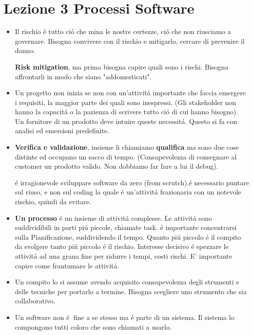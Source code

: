 \documentclass[a4paper,10pt] {article}
\begin{document}
\section{Lezione 3 Processi Software}
\begin{itemize}
	\item Il rischio \'e tutto ci\'o che mina le nostre certezze, ci\'o che non 
	riusciamo a governare. Bisogna convivere con
	il rischio e mitigarlo, cercare di prevenire il danno.
	
	\textbf{Risk mitigation}, ma prima bisogna capire quali sono i rischi.
	Bisogna affrontarli in modo che siano "addomesticati".
	
	
	\item Un progetto non inizia se non con un'attivit\'a importante che faccia 
	emergere i requisiti, la maggior parte dei quali sono inespressi. (Gli 
	stakeholder non hanno la capacit\'a o la pazienza 
	di scrivere tutto ci\'o di cui hanno
	bisogno). Un fornitore di un prodotto deve intuire queste necessit\'a. 
	Questo si fa con analisi ed emersioni predefinite.
	
	\item \textbf{Verifica e validazione}, insieme li chiamiamo 
	\textbf{qualifica} ma sono due cose distinte ed occupano un sacco di
	tempo. (Consapevolezza di consegnare al customer un prodotto valido. Non 
	dobbiamo far fare a lui il debug).
	
	\'e irragionevole sviluppare software da zero (from scrutch).\'e necessario 
	puntare sul riuso, e non sul coding la quale \'e un'attivit\'a frazionaria 
	con un notevole rischio, quindi da evitare.
	
	\item \textbf{Un processo} \'e un insieme di attivit\'a complesse. Le 
	attivit\'a sono suddividibili in parti pi\'u piccole, chiamate
	task. \'e importante concentrarsi sulla Pianificazione, suddividendo il 
	tempo.
	 Quanto pi\'u piccolo \'e il compito da svolgere tanto pi\'u
	piccolo \'e il rischio. Interesse decisivo \'e spezzare le attivit\'a ad 
	una grana fine per ridurre i tempi, costi rischi. E' importante capire come 
	frantumare le attivit\'a.  
	
	
	\item  Un compito lo si assume avendo acquisito consapevolezza degli 
	strumenti e delle tecniche per portarlo
	a termine. Bisogna scegliere uno strumento che sia collaborativo.
	
	\item Un software non \'e fine a se stesso ma \'e parte di un sistema. Il 
	sistema lo compongono tutti coloro che sono chiamati a usarlo. 
	

\end{itemize}
\end{document}
